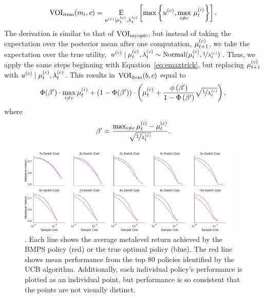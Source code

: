 \begin{equation}
  \text{VOI}_\text{item}(m_t,c)=\operatorname*{E}_{u^{(c)} \mid \mu_{t}^{(c)}, \lambda_{t}^{(c)}} \left[
    \max \left\{ u^{(c)},\max_{i\neq c}\,\mu_t^{(i)} \right\}
  \right].
\end{equation}
%
The derivation is similar to that of $\text{VOI}_\text{myopic}$, but instead of taking the expectation over the posterior mean after one computation, $\mu_{t+1}^{(c)}$, we take the expectation over the true utility, $u^{(c)} \mid \mu_{t}^{(c)}, \lambda_{t}^{(c)} \sim \mathrm{Normal}(\mu_{t}^{(c)},\nicefrac{1}{\lambda_{t}^{(c)}})$. Thus, we apply the same steps beginning with Equation~\ref{eq:emaxtrick}, but replacing $\mu_{t+1}^{(c)}$ with $u^{(c)} \mid \mu_{t}^{(c)}, \lambda_{t}^{(c)}$. This results in $\text{VOI}_\text{item}(b, c)$ equal to
%
%
\begin{equation}
  \Phi(\beta')\cdot\max_{i\neq c}\mu_t^{(i)}+\left(1-\Phi(\beta')\right)\cdot\left(\mu_{t}^{(c)}+\frac{\phi\left(\beta'\right)}{1-\Phi\left(\beta'\right)}
  \sqrt{\nicefrac{1}{\lambda_{t}^{(c)}}}\right),
\end{equation}
%
where 
%
\begin{equation}
  \beta'=\frac{\max_{i\neq c}\mu_t^{(i)}-\mu_{t}^{(c)}}{\sqrt{\nicefrac{1}{\lambda_{t}^{(c)}}}}.
\end{equation}
%


\begin{figure}[b!]
  
  \centering
  \includegraphics[width=0.95\textwidth]{figs/attention/supp-bernoulli.pdf}
  \caption{.
    Each line shows the average metalevel return achieved by the BMPS policy (red) or the true optimal policy (blue). The red line shows mean performance from the top 80 policies identified by the UCB algorithm. Additionally, each individual policy's performance is plotted as an individual point, but performance is so consistent that the points are not visually distinct.}
  \label{fig:attention-bernoulli}
  
\end{figure}  %

